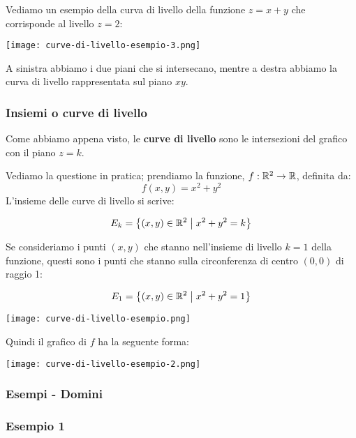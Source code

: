 Vediamo un esempio della curva di livello della funzione \(z=x+y\) che corrisponde al livello \(z=2\):

\begin{center}
    \texttt{[image: curve-di-livello-esempio-3.png]}
\end{center}

A sinistra abbiamo i due piani che si intersecano, mentre a destra abbiamo la curva di livello rappresentata sul piano \(xy\).

\pagebreak
\subsubsection{Insiemi o curve di livello}

Come abbiamo appena visto, le \textbf{curve di livello} sono le intersezioni del grafico con il piano \(z=k\).

Vediamo la questione in pratica; prendiamo la funzione, \(f: \mathbb{R}^2 \to \mathbb{R} \), definita da:
\[
    f(x,y) = x^2 + y^2
\]
L'insieme delle curve di livello si scrive:

\[
    E_k = \left\{ (x,y) \in \mathbb{R}^{2} \;\big|\; x^{2}+y^{2}=k \right\}
\]

Se consideriamo i punti \((x,y)\) che stanno nell'insieme di livello \(k=1\) della funzione, questi sono i punti che stanno sulla circonferenza di centro \((0,0)\) di raggio 1:

\[
    E_1 = \left\{ (x,y) \in \mathbb{R}^{2} \;\big|\; x^{2}+y^{2}=1 \right\}
\]

\begin{center}
    \texttt{[image: curve-di-livello-esempio.png]}
\end{center}

\filbreak{}
Quindi il grafico di \(f\) ha la seguente forma:

\begin{center}
    \texttt{[image: curve-di-livello-esempio-2.png]}
\end{center}

\pagebreak
\subsubsection{Esempi {-} Domini}

\subsubsection*{Esempio 1}

